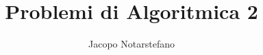 \documentclass[a4paper, 12pt]{book}
\theoremstyle{plain}
\begin{document}
    \title{Problemi di Algoritmica 2}
    \author{Jacopo Notarstefano}
    
    \maketitle

    
    
    
    
    
    
    
    
    
    
    
    
    
    
\end{document}
